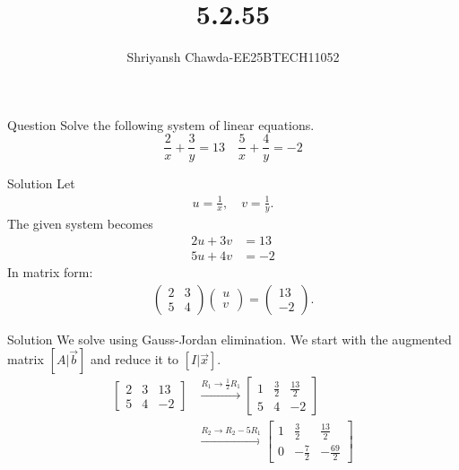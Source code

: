 \documentclass{beamer}
\newcommand{\myvec}[1]{\ensuremath{\begin{pmatrix}#1\end{pmatrix}}}
\begin{document}
	\title{5.2.55}
	\author{Shriyansh Chawda-EE25BTECH11052}
	\frame{\titlepage}
	\begin{frame}{Question}
		Solve the following system of linear equations.\[
		\frac{2}{x} + \frac{3}{y} = 13 \quad \frac{5}{x} + \frac{4}{y} = -2 \]
	\end{frame}
	
	\begin{frame}{Solution}
		Let
		\begin{align}
			u = \frac{1}{x}, \quad v = \frac{1}{y}.
		\end{align}
		The given system becomes
		\begin{align}
			2u + 3v &= 13 \\
			5u + 4v &= -2
		\end{align}
		In matrix form:
		\begin{align}
			\myvec{2 & 3 \\ 5 & 4} \myvec{u \\ v} = \myvec{13 \\ -2}.
		\end{align}
	\end{frame}
	
	\begin{frame}{Solution}
		We solve using Gauss-Jordan elimination. We start with the augmented matrix $[A|\vec{b}]$ and reduce it to $[I|\vec{x}]$.
		\begin{align}
			\left[\begin{array}{cc|c}
				2 & 3 & 13 \\
				5 & 4 & -2
			\end{array}\right]
			&\xrightarrow{R_1 \rightarrow \frac{1}{2}R_1}
			\left[\begin{array}{cc|c}
				1 & \frac{3}{2} & \frac{13}{2} \\
				5 & 4 & -2
			\end{array}\right] \\
			&\xrightarrow{R_2 \rightarrow R_2 - 5R_1}
			\left[\begin{array}{cc|c}
				1 & \frac{3}{2} & \frac{13}{2} \\
				0 & -\frac{7}{2} & -\frac{69}{2}
			\end{array}\right] 
		\end{align}
	\end{frame}
	
\end{document}
